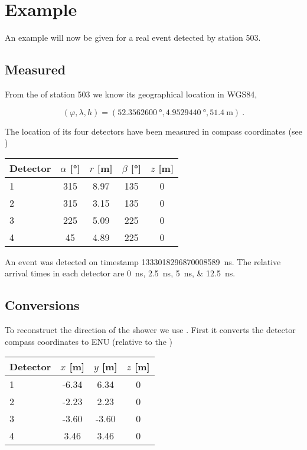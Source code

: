 \section{Example}
\label{sec:example}

An example will now be given for a real \hisparc event detected by
station 503.


\subsection{Measured}

From the \gps of station 503 we know its geographical location in WGS84,

\begin{equation}
    (\varphi, \lambda, h) = (\SI{52.3562600}{\degree},
                             \SI{4.9529440}{\degree},
                             \SI{51.4}{\meter}) \ .
\end{equation}

The location of its four detectors have been measured in compass
coordinates (see )

\begin{center}
    \begin{tabular}{ l c c c c }
        \toprule
        Detector & $\alpha$ [\si{\degree}] & $r$ [\si{\meter}] &
        $\beta$ [\si{\degree}] & $z$ [\si{\meter}] \\
        \midrule
        1 & 315 & 8.97 & 135 & 0 \\
        2 & 315 & 3.15 & 135 & 0 \\
        3 & 225 & 5.09 & 225 & 0 \\
        4 &  45 & 4.89 & 225 & 0 \\
        \bottomrule
    \end{tabular}
\end{center}
                        
An event was detected on \gps timestamp
\SI{1333018296870008589}{\nano\second}. The relative arrival times in
each detector are \SIlist{0;2.5;5;12.5}{\nano\second}.


\subsection{Conversions}

To reconstruct the direction of the shower we use \sapphire. First it
converts the detector compass coordinates to ENU (relative to the \gps)

\begin{center}
    \begin{tabular}{ l c c c }
        \toprule
        Detector & $x$ [\si{\meter}] & $y$ [\si{\meter}] & $z$ [\si{\meter}] \\
        \midrule
        1 & -6.34 &  6.34 & 0 \\
        2 & -2.23 &  2.23 & 0 \\
        3 & -3.60 & -3.60 & 0 \\
        4 &  3.46 &  3.46 & 0 \\
        \bottomrule
    \end{tabular}
\end{center}

